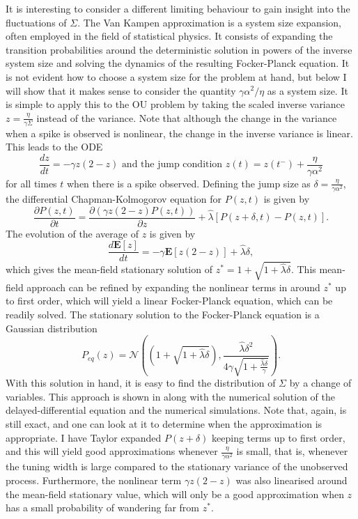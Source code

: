 It is interesting to consider a different limiting behaviour to gain insight into the fluctuations of $\Sigma$. The Van Kampen approximation is a system size expansion, often
employed in the field of statistical physics. It consists of expanding the transition
probabilities around the deterministic solution in powers of the inverse system size and solving the dynamics of the resulting Focker-Planck equation. It is not evident how to choose
a system size for the problem at hand, but below I will show that it makes sense to consider the quantity $\gamma \alpha^2/\eta$ as a system size. It is simple to apply this
to the OU problem by taking the scaled inverse variance $z= \frac{\eta}{\gamma \Sigma}$ instead of the variance.
Note that although the change in the variance when a spike is observed is nonlinear, the change in the inverse variance is linear. This leads to the ODE
\[
\frac{dz}{dt} = -\gamma z \left(2- z\right) \textrm{ and the jump condition } z(t) = z(t^- ) + \frac{\eta}{\gamma \alpha^2}
\]
for all times $t$ when there is a spike observed. Defining the jump size as $\delta =  \frac{\eta}{\gamma \alpha^2}$, the differential Chapman-Kolmogorov equation for $P(z,t)$ is 
given by
\begin{equation}
\label{eq:DCKE_Z}
\frac{\partial P(z,t)}{\partial t} = \frac{\partial \left( \gamma z \left(2- z\right) P(z,t)\right)}{\partial z} + 
\hat{\lambda}\left[ P\left(z+\delta,t\right) - P(z,t)\right].
\end{equation}
The evolution of the average of $z$ is given by
\[
\frac{d \boldsymbol{E}\left[z\right]}{dt} = -\gamma\boldsymbol{E}\left[ z \left(2-z\right)\right]+ \hat{\lambda}\delta,
\]
which gives the mean-field stationary solution of $z^* =1+\sqrt{1+\hat{\lambda} \delta}$. 
This mean-field approach can be refined by expanding the nonlinear terms in  around $z^*$ up to first order, which will yield a linear Focker-Planck equation, which 
can be readily solved. The stationary solution to the Focker-Planck equation is a Gaussian distribution
\[
P_{eq}(z) = \mathcal{N}\left(\left(1+\sqrt{1+\hat{\lambda}\delta}\right), 
\frac{ \hat{\lambda}\delta^2 }{4\gamma \sqrt{1+\frac{\hat{\lambda}\delta}{\gamma} }}\right).
\]
With this solution in hand, it is easy to find the distribution of $\Sigma$ by a change of variables.
This approach is shown in  along with the numerical solution of the delayed-differential equation and the numerical simulations. 
Note that, again,  is still exact, and one can look at it to determine when the approximation is appropriate. I have Taylor expanded 
$P(z+\delta)$ keeping terms up to first order, and this will yield good approximations whenever $\frac{\eta}{\gamma\alpha^2}$ is small, that is, whenever the tuning width
is large compared to the stationary variance of the unobserved process. Furthermore, the nonlinear term $\gamma z (2-z)$ was also linearised around the mean-field stationary
value, which will only be a good approximation when $z$ has a small probability of wandering far from $z^*$. 
\par

